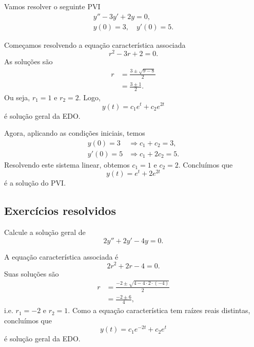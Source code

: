 \begin{ex}
  Vamos resolver o seguinte PVI
  \begin{align}
    y'' - 3y' + 2y = 0,\\
    y(0) = 3,\quad y'(0) = 5.
  \end{align}

  Começamos resolvendo a equação característica associada
  \begin{equation}
    r^2 -3r + 2 = 0.
  \end{equation}
  As soluções são
  \begin{align}
    r &= \frac{3 \pm \sqrt{9 - 8}}{2} \\
      &= \frac{3 \pm 1}{2}.
  \end{align}
  Ou seja, $r_1 = 1$ e $r_2 = 2$. Logo,
  \begin{equation}
    y(t) = c_1e^t + c_2e^{2t}
  \end{equation}
  é solução geral da EDO.

  Agora, aplicando as condições iniciais, temos
  \begin{align}
    y(0) = 3 &\Rightarrow c_1 + c_2 = 3,\\
    y'(0) = 5 &\Rightarrow c_1 + 2c_2 = 5.
  \end{align}
  Resolvendo este sistema linear, obtemos $c_1 = 1$ e $c_2 = 2$. Concluímos que
  \begin{equation}
    y(t) = e^t + 2e^{2t}
  \end{equation}
  é a solução do PVI.
\end{ex}

\subsection*{Exercícios resolvidos}

\begin{exeresol}
  Calcule a solução geral de
  \begin{equation}
    2y'' + 2y' - 4y = 0.
  \end{equation}
\end{exeresol}
\begin{resol}
  A equação característica associada é
  \begin{equation}
    2r^2 + 2r -4 = 0.
  \end{equation}
  Suas soluções são
  \begin{align}
    r &= \frac{-2 \pm \sqrt{4 - 4\cdot 2\cdot (-4)}}{2} \\
    &= \frac{-2 \pm 6}{4},
  \end{align}
  i.e. $r_1 = -2$ e $r_2 = 1$. Como a equação característica tem raízes reais distintas, concluímos que
  \begin{equation}
    y(t) = c_1e^{-2t} + c_2e^{t}
  \end{equation}
  é solução geral da EDO.
\end{resol}

